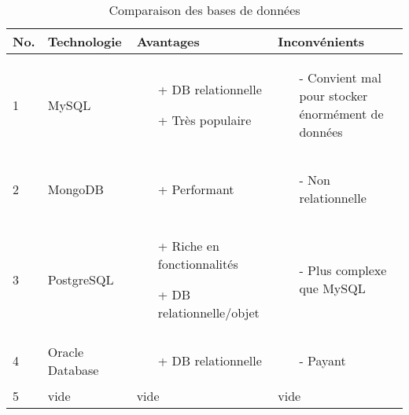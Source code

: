 \documentclass[
    iai, %
    eai, %
]{heig-tb}
\begin{document}
\begin{table}[h]
  \begin{center}
    \caption{Comparaison des bases de données \label{specification}}
    \begin{tabularx}{\textwidth}{|m{1cm} |m{2cm} |m{4cm} |m{4cm}|}
      No. & Technologie     & Avantages                  & Inconvénients \\ \toprule
      1   & MySQL           & \begin{itemize}
        \item[+] DB relationnelle
        \item[+] Très populaire
      \end{itemize}  & 
      \begin{itemize}
        \item[-] Convient mal pour stocker énormément de données
      \end{itemize}                                          \\ \midrule
      2   & MongoDB         & \begin{itemize}
        \item[+] Performant
      \end{itemize}  & 
      \begin{itemize}
        \item[-] Non relationnelle
      \end{itemize}                                         \\ \midrule
      3   & PostgreSQL      & \begin{itemize}
        \item[+] Riche en fonctionnalités
        \item[+] DB relationnelle/objet
      \end{itemize} & 
      \begin{itemize}
        \item[-] Plus complexe que MySQL
      \end{itemize}                                         \\ \midrule
      4   & Oracle Database & \begin{itemize}
        \item[+] DB relationnelle
      \end{itemize} & 
      \begin{itemize}
        \item[-] Payant
      \end{itemize}                                         \\ \midrule
      5   & vide            & vide                       & vide          \\ \midrule
    \end{tabularx}
  \end{center}
\end{table}
\end{document}
